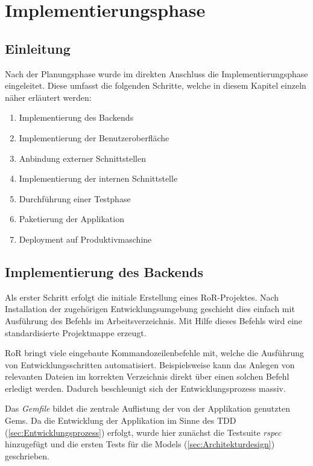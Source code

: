 
\section{Implementierungsphase}
\label{sec:Implementierungsphase}

\subsection{Einleitung}
\label{sec:Einleitung}
Nach der Planungsphase wurde im direkten Anschluss die Implementierungsphase eingeleitet. Diese
umfasst die folgenden Schritte, welche in diesem Kapitel einzeln näher erläutert werden:
\begin{enumerate}
	\item Implementierung des Backends
	\item Implementierung der Benutzeroberfläche
	\item Anbindung externer Schnittstellen
	\item Implementierung der internen Schnittstelle
	\item Durchführung einer Testphase
	\item Paketierung der Applikation
	\item Deployment auf Produktivmaschine
\end{enumerate}

\subsection{Implementierung des Backends}
\label{sec:Implementierung des Backends}
Als erster Schritt erfolgt die initiale Erstellung eines \acs{RoR}-Projektes.
Nach Installation der zugehörigen Entwicklungsumgebung geschieht dies einfach mit Ausführung des
Befehls  im Arbeitsverzeichnis. Mit Hilfe dieses Befehls wird eine
standardisierte Projektmappe erzeugt.

RoR bringt viele eingebaute Kommandozeilenbefehle mit, welche die Ausführung von
Entwicklungsschritten automatisiert. Beispielsweise kann das Anlegen von relevanten Dateien im
korrekten Verzeichnis direkt über einen solchen Befehl erledigt werden. Dadurch beschleunigt sich der Entwicklungsprozess massiv.

Das \textit{Gemfile} bildet die zentrale Auflistung der von der Applikation genutzten Gems. Da die
Entwicklung der Applikation im Sinne des \acs{TDD} (\Vgl \ref{sec:Entwicklungsprozess}) erfolgt,
wurde hier zunächst die Testsuite \textit{rspec} hinzugefügt und die ersten Tests für die Models
(\Vgl \ref{sec:Architekturdesign}) geschrieben.


